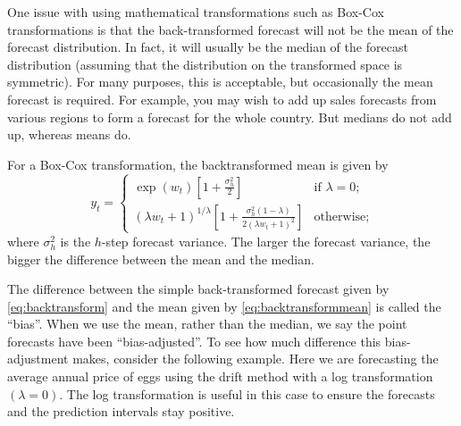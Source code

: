 \documentclass[]{book}
\newenvironment{Shaded}{\begin{snugshade}}{\end{snugshade}}
\newcommand{\CommentTok}[1]{\textcolor[rgb]{0.56,0.35,0.01}{\textit{#1}}}
\newcommand{\DataTypeTok}[1]{\textcolor[rgb]{0.13,0.29,0.53}{#1}}
\newcommand{\DecValTok}[1]{\textcolor[rgb]{0.00,0.00,0.81}{#1}}
\newcommand{\KeywordTok}[1]{\textcolor[rgb]{0.13,0.29,0.53}{\textbf{#1}}}
\newcommand{\NormalTok}[1]{#1}
\newcommand{\OtherTok}[1]{\textcolor[rgb]{0.56,0.35,0.01}{#1}}
\newcommand{\StringTok}[1]{\textcolor[rgb]{0.31,0.60,0.02}{#1}}
\begin{document}
One issue with using mathematical transformations such as Box-Cox transformations is that the back-transformed forecast will not be the mean of the forecast distribution. In fact, it will usually be the median of the forecast distribution (assuming that the distribution on the transformed space is symmetric). For many purposes, this is acceptable, but occasionally the mean forecast is required. For example, you may wish to add up sales forecasts from various regions to form a forecast for the whole country. But medians do not add up, whereas means do.

For a Box-Cox transformation, the backtransformed mean is given by
\begin{equation}
\label{eq:backtransformmean}
y_t =
  \begin{cases}
     \exp(w_t)\left[1 + \frac{\sigma_h^2}{2}\right] & \text{if $\lambda=0$;}\\
     (\lambda w_t+1)^{1/\lambda}\left[1 + \frac{\sigma_h^2(1-\lambda)}{2(\lambda w_t+1)^{2}}\right] & \text{otherwise;}
  \end{cases}
\end{equation}
where \(\sigma_h^2\) is the \(h\)-step forecast variance. The larger the forecast variance, the bigger the difference between the mean and the median.

The difference between the simple back-transformed forecast given by \eqref{eq:backtransform} and the mean given by \eqref{eq:backtransformmean} is called the ``bias''. When we use the mean, rather than the median, we say the point forecasts have been ``bias-adjusted''. To see how much difference this bias-adjustment makes, consider the following example. Here we are forecasting the average annual price of eggs using the drift method with a log transformation \((\lambda=0)\). The log transformation is useful in this case to ensure the forecasts and the prediction intervals stay positive.

\begin{Shaded}
\end{Shaded}
\end{document}
